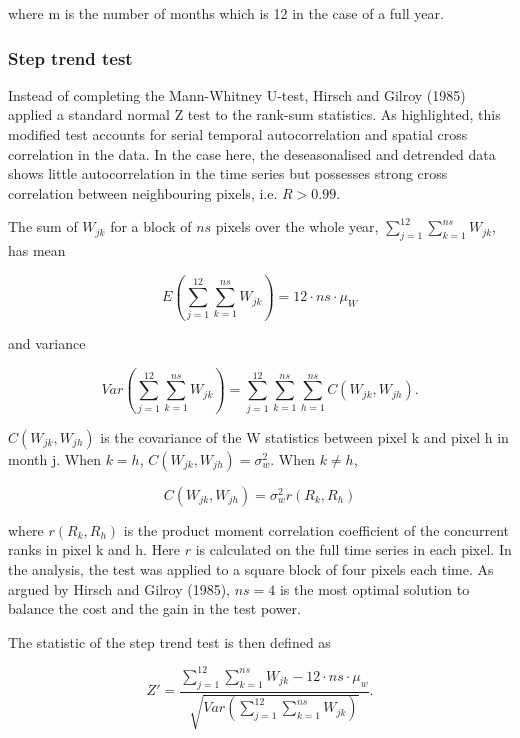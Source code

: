\documentclass[fleqn,10pt,lineno]{wlpeerj} %
\begin{document}
where m is the number of months which is 12 in the case of a full year.

\subsubsection{Step trend test}\label{step-trend-test-1}

Instead of completing the Mann-Whitney U-test, Hirsch and Gilroy (1985)
applied a standard normal Z test to the rank-sum statistics. As
highlighted, this modified test accounts for serial temporal
autocorrelation and spatial cross correlation in the data. In the case
here, the deseasonalised and detrended data shows little autocorrelation
in the time series but possesses strong cross correlation between
neighbouring pixels, i.e. \(R>0.99\).

The sum of \(W_{jk}\) for a block of \(ns\) pixels over the whole year,
\(\sum_{j=1}^{12}\sum_{k=1}^{ns}W_{jk}\), has mean

\begin{equation}
  E(\sum_{j=1}^{12}\sum_{k=1}^{ns}W_{jk})=12\cdot ns\cdot\mu_W
\end{equation}

and variance

\begin{equation}
  Var(\sum_{j=1}^{12}\sum_{k=1}^{ns}W_{jk})=\sum_{j=1}^{12}\sum_{k=1}^{ns}\sum_{h=1}^{ns}C(W_{jk},W_{jh}).
\end{equation}

\(C(W_{jk},W_{jh})\) is the covariance of the W statistics between pixel
k and pixel h in month j. When \(k=h\), \(C(W_{jk},W_{jh})=\sigma^2_w\).
When \(k\neq h\),

\begin{equation}
  C(W_{jk},W_{jh})=\sigma^2_w r(R_k,R_h)
\end{equation}

where \(r(R_k,R_h)\) is the product moment correlation coefficient of
the concurrent ranks in pixel k and h. Here \(r\) is calculated on the
full time series in each pixel. In the analysis, the test was applied to
a square block of four pixels each time. As argued by Hirsch and Gilroy
(1985), \(ns=4\) is the most optimal solution to balance the cost and
the gain in the test power.

The statistic of the step trend test is then defined as

\begin{equation}
  Z'=\frac{\sum_{j=1}^{12}\sum_{k=1}^{ns}W_{jk}-12\cdot ns\cdot\mu_w}{\sqrt{Var(\sum_{j=1}^{12}\sum_{k=1}^{ns}W_{jk})}}.
  \label{eq:Z}
\end{equation}
\end{document}
